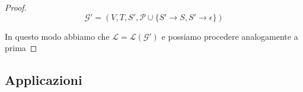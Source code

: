 \documentclass[class=book, crop=false, oneside, 12pt]{standalone}
\begin{document}
\begin{proof}
   \begin{equation*}
     \mathcal{G}' = (V, T, S', \mathcal{P} \cup \{ S' \rightarrow S, S' \rightarrow \epsilon \})
   \end{equation*}

   In questo modo abbiamo che \(\mathcal{L} = \mathcal{L(G')}\) e possiamo procedere analogamente a prima

\end{proof}

\subsection{Applicazioni}
\end{document}
